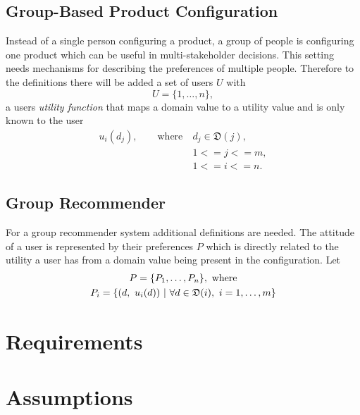 \subsection{Group-Based Product Configuration}
\label{sec:Foundations:GroupBasedProductConfiguration}

Instead of a single person configuring a product, a group of people is configuring one product which can be useful in multi-stakeholder decisions. This setting needs mechanisms for describing the preferences of multiple people. Therefore to the definitions there will be added a set of users $U$ with
\begin{equation}\label{eq:Foundations:ProductConfiguration:Users}
    U = \{1, \dotsc, n\},
\end{equation}
a users \emph{utility function} that maps a domain value to a utility value and is only known to the user
\begin{equation}
    \begin{split}
        u_i(d_j), \qquad \text{where}\ & d_j \in  \mathfrak{D}(j),\\
        & 1 <= j <= m, \\
        & 1 <= i <= n .
    \end{split}
\end{equation}

\subsection{Group Recommender}

For a group recommender system additional definitions are needed. The attitude of a user is represented by their preferences $P$ which is directly related to the utility a user has from a domain value being present in the configuration. Let 
\begin{gather} \label{tab:Foundations:GroupRecommenderSystem:Preferences}
    P = \{ P_1, \dotsc, P_n\},\ \text{where} \\
    P_i = \{(d,\ u_i(d)) \ | \ \forall d \in \mathfrak{D}(i),\ i=1,\dotsc,m \} \notag
\end{gather}


\section{Requirements}
\label{sec:Concept:Requirements}

\section{Assumptions}
\label{sec:Concept:Assumptions}

